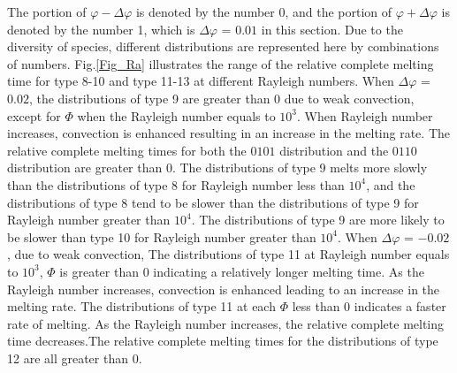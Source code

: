 \documentclass[preprint,12pt]{elsarticle}
\begin{document}
The portion of $\varphi-\Delta\varphi$ is denoted by the number 0, and the portion of $\varphi+\Delta\varphi$ is denoted by the number 1, which is $\Delta\varphi$ = $ 0.01 $ in this section. Due to the diversity of species, different distributions are represented here by combinations of numbers.
Fig.\ref{Fig_Ra} illustrates the range of the relative complete melting time for type 8-10 and type 11-13 at different Rayleigh numbers. When $ \Delta\varphi$ = $ 0.02 $, the  distributions of type 9 are greater than 0 due to weak convection, except for $ \Phi $ when the Rayleigh number equals to $ 10^3 $. When Rayleigh number increases, convection is enhanced resulting in an increase in the melting rate. The relative complete melting times for both the $ 0101 $ distribution and the $ 0110 $ distribution are greater than $ 0 $. The  distributions of type 9 melts more slowly than the distributions of type 8 for Rayleigh number less than $ 10^4 $, and the distributions of type 8 tend to be slower than the distributions of type 9 for Rayleigh number greater than $ 10^4 $. The  distributions of type 9 are more likely to be slower than type 10 for Rayleigh number greater than $ 10^4 $. When $\Delta\varphi$ = $ -0.02 $, due to weak convection, The  distributions of type 11 at Rayleigh number equals to $ 10^3 $, $ \Phi $ is greater than 0 indicating a relatively longer melting time. As the Rayleigh number increases, convection is enhanced leading to an increase in the melting rate. The distributions of type 11 at each  $ \Phi $ less than 0 indicates a faster rate of melting. As the Rayleigh number increases, the relative complete melting time decreases.The relative complete melting times for the distributions of type 12 are all greater than 0.
\end{document}
